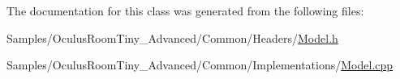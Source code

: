 The documentation for this class was generated from the following files\+:\begin{DoxyCompactItemize}
\item 
Samples/\+Oculus\+Room\+Tiny\+\_\+\+Advanced/\+Common/\+Headers/\hyperlink{_model_8h}{Model.\+h}\item 
Samples/\+Oculus\+Room\+Tiny\+\_\+\+Advanced/\+Common/\+Implementations/\hyperlink{_model_8cpp}{Model.\+cpp}\end{DoxyCompactItemize}
